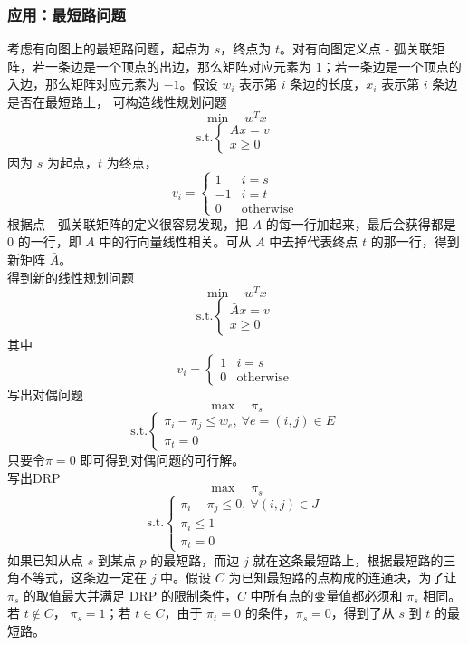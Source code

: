 \subsubsection{应用：最短路问题}
考虑有向图上的最短路问题，起点为 $s$，终点为 $t$。对有向图定义点 - 弧关联矩阵，若一条边是一个顶点的出边，那么矩阵对应元素为 $1$；若一条边是一个顶点的入边，那么矩阵对应元素为 $-1$。假设 $w_i$ 表示第 $i$ 条边的长度，$x_i$ 表示第 $i$ 条边是否在最短路上，
可构造线性规划问题
$$
\min \quad w^Tx
$$
$$
\text{s.t.} 
\begin{cases}
    Ax = v \\
    x \ge 0
\end{cases}
$$
因为 $s$ 为起点，$t$ 为终点，
$$
v_i = \begin{cases} 1 & i = s \\ -1 & i = t \\ 0 & \text{otherwise} \end{cases}
$$
根据点 - 弧关联矩阵的定义很容易发现，把 $A$ 的每一行加起来，最后会获得都是 $0$ 的一行，即 $A$ 中的行向量线性相关。可从 $A$ 中去掉代表终点 $t$ 的那一行，得到新矩阵 $\bar{A}$。 \\
得到新的线性规划问题
$$
\min \quad w^Tx
$$
$$
\text{s.t.} 
\begin{cases}
    \bar{A}x = v \\
    x \ge 0
\end{cases}
$$
其中
$$
v_i = \begin{cases} 1 & i = s \\ 0 & \text{otherwise} \end{cases}
$$
写出对偶问题
$$
\max \quad \pi_s
$$
$$
\text{s.t.} 
\begin{cases}
    \pi_i - \pi_j \le w_e, \ \forall e = (i, j) \in E \\
    \pi_t = 0
\end{cases}
$$
只要令$\pi = 0$ 即可得到对偶问题的可行解。 \\
写出DRP
$$
\max \quad \pi_s
$$
$$
\text{s.t.} 
\begin{cases}
    \pi_i - \pi_j \le 0, \ \forall (i, j) \in J \\
    \pi_i \le 1 \\
    \pi_t = 0
\end{cases}
$$
如果已知从点 $s$ 到某点 $p$ 的最短路，而边 $j$ 就在这条最短路上，根据最短路的三角不等式，这条边一定在 $j$ 中。假设 $C$ 为已知最短路的点构成的连通块，为了让 $\pi_s$ 的取值最大并满足 DRP 的限制条件，$C$ 中所有点的变量值都必须和 $\pi_s$ 相同。若 $t \not\in C$， $\pi_s = 1$；若 $t \in C$，由于 $\pi_t = 0$ 的条件，$\pi_s = 0$，得到了从 $s$ 到 $t$ 的最短路。 \\~\\
